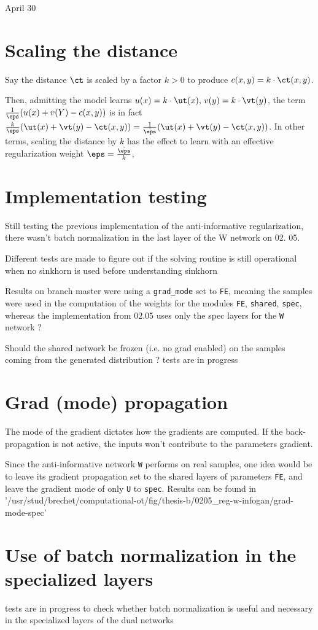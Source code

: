 \documentclass[11pt,a4paper]{article}
\begin{document}
{\Huge April 30}

\section{Scaling the distance}

Say the distance $\ct$ is scaled by a factor $k>0$ to produce $c(x, y) = k\cdot \ct(x,y)$.

Then, admitting the model learns $u(x) = k\cdot \ut(x),\, v(y) = k \cdot
\vt(y)$, the term $\frac{1}{\eps}(u(x) + v(Y) - c(x, y))$ is in fact
$\frac{k}{\eps}(\ut(x) + \vt(y) - \ct(x,y)) =
\frac{1}{\tilde{\eps}}(\ut(x) + \vt(y) - \ct(x,y))$. In other terms, scaling
the distance by $k$ has the effect to learn with an effective regularization
weight $\eps = \frac{\tilde{\eps}}{k}$,


\section{Implementation testing}
    Still testing the previous implementation of the anti-informative regularization, there wasn't batch normalization in the last layer of the W network on 02. 05.

    Different tests are made to figure out if the solving routine is still operational when no sinkhorn is used before understanding sinkhorn

    Results on branch master were using a \texttt{grad_mode} set to \texttt{FE}, meaning the samples were used in the computation of the weights for the modules \texttt{FE}, \texttt{shared}, \texttt{spec}, whereas the implementation from 02.05 uses only the spec layers for the \texttt{W} network ?

    Should the shared network be frozen (i.e. no grad enabled) on the samples coming from the generated distribution ? tests are in progress

\section{Grad (mode) propagation}
    The mode of the gradient dictates how the gradients are computed. If the back-propagation is not active, the inputs won't contribute to the parameters gradient.

    Since the anti-informative network \texttt{W} performs on real samples, one idea would be to leave its gradient propagation set to the shared layers of parameters \texttt{FE}, and leave the gradient mode of only \texttt{U} to \texttt{spec}.
    Results can be found in '/usr/stud/brechet/computational-ot/fig/thesis-b/0205_reg-w-infogan/grad-mode-spec'

\section{Use of batch normalization in the specialized layers}
    tests are in progress to check whether batch normalization is useful and necessary in the specialized layers of the dual networks
\end{document}
